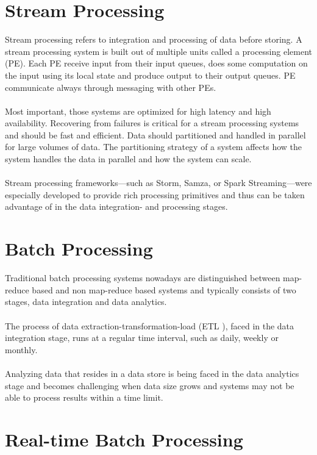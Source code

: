 \section{Stream Processing}
\label{intro-datastream-streamprocessing}
Stream processing refers to integration and processing of data before storing. 
A stream processing system is built out of multiple units called a processing
element (PE). Each PE receive input from their input queues, does some
computation on the input using its local state and produce output to their
output queues. PE communicate always through messaging with other PEs. 
\\ \\
Most important, those systems are optimized for high latency and high
availability. Recovering from failures is critical for a stream processing
systems and should be fast and efficient. 
Data should partitioned and handled in parallel for large volumes of data. 
The partitioning strategy of a system  affects how the system
handles the data in parallel and how the system can scale. 
\cite{PrpSvyOfDSPS}
\\ \\
Stream processing frameworks---such as Storm, Samza, or Spark
Streaming---were especially developed to provide rich processing primitives and thus can be taken advantage of
in the data integration- and processing stages.


\section{Batch Processing}
\label{intro-datastream-batchprocessing}
Traditional batch processing systems nowadays are distinguished between
map-reduce based and non map-reduce  based systems and typically consists of two
stages, data integration and data analytics. 
\\ \\
The process of data extraction-transformation-load (ETL  ), 
faced in the data integration
stage, runs at a regular time interval, such as daily, weekly or monthly. 
\\ \\
Analyzing data that resides in a data store is being faced in the
data analytics stage and becomes challenging when data size grows and systems
may not be able to process results within a time limit.
\cite{Liu:2014:SRP:2628194.2628251}


\section{Real-time Batch Processing}


